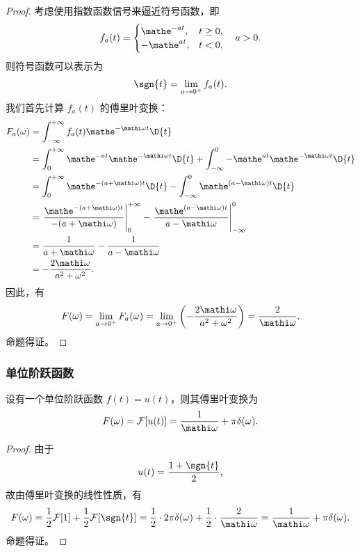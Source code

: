 \begin{proof}
    考虑使用指数函数信号来逼近符号函数，即
    \begin{align*}
        f_a(t) = \begin{cases}
            \mathe^{-at}, & t \ge 0, \\
            -\mathe^{at}, & t < 0,
        \end{cases}
        \quad a > 0.
    \end{align*}
    则符号函数可以表示为
    \begin{align*}
        \sgn{t} = \lim_{a \to 0^+}f_a(t).
    \end{align*}
    我们首先计算 $f_a(t)$ 的傅里叶变换：
    \begin{align*}
        F_a(\omega) & = \int_{-\infty}^{+\infty}f_a(t)\mathe^{-\mathi\omega t}\D{t} \\
        & = \int_{0}^{+\infty}\mathe^{-at}\mathe^{-\mathi\omega t}\D{t} + \int_{-\infty}^{0}-\mathe^{at}\mathe^{-\mathi\omega t}\D{t} \\
        & = \int_{0}^{+\infty}\mathe^{-(a + \mathi\omega)t}\D{t} - \int_{-\infty}^{0}\mathe^{(a - \mathi\omega)t}\D{t} \\
        & = \left.\frac{\mathe^{-(a + \mathi\omega)t}}{-(a + \mathi\omega)}\right|_{0}^{+\infty} - \left.\frac{\mathe^{(a - \mathi\omega)t}}{a - \mathi\omega}\right|_{-\infty}^{0} \\
        & = \frac{1}{a + \mathi\omega} - \frac{1}{a - \mathi\omega} \\
        & = -\frac{2\mathi\omega}{a^2 + \omega^2}.
    \end{align*}
    因此，有
    \begin{align*}
        F(\omega) = \lim_{a \to 0^+}F_a(\omega) = \lim_{a \to 0^+}\left(-\frac{2\mathi\omega}{a^2 + \omega^2}\right) = \frac{2}{\mathi\omega}.
    \end{align*}
    命题得证。
\end{proof}

\subsubsection{单位阶跃函数}

\begin{theorem}
    \label{thm:unit-step-function-ft}
    设有一个单位阶跃函数 $f(t) = u(t)$，则其傅里叶变换为
    \begin{align*}
        F(\omega) = \mathcal{F}[u(t)] = \frac{1}{\mathi\omega} + \pi\delta(\omega).
    \end{align*}
\end{theorem}

\begin{proof}
    由于
    \begin{align*}
        u(t) = \frac{1 + \sgn{t}}{2},
    \end{align*}
    故由傅里叶变换的线性性质，有
    \begin{align*}
        F(\omega) = \frac{1}{2}\mathcal{F}[1] + \frac{1}{2}\mathcal{F}[\sgn{t}] = \frac{1}{2}\cdot 2\pi\delta(\omega) + \frac{1}{2}\cdot \frac{2}{\mathi\omega} = \frac{1}{\mathi\omega} + \pi\delta(\omega).
    \end{align*}
    命题得证。
\end{proof}
